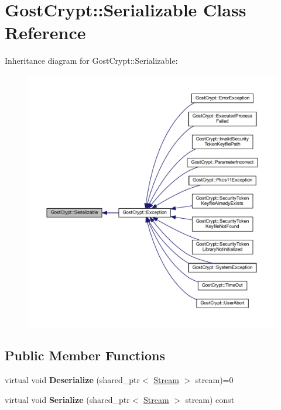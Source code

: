 \hypertarget{class_gost_crypt_1_1_serializable}{}\section{Gost\+Crypt\+:\+:Serializable Class Reference}
\label{class_gost_crypt_1_1_serializable}


Inheritance diagram for Gost\+Crypt\+:\+:Serializable\+:
\nopagebreak
\begin{figure}[H]
\begin{center}
\leavevmode
\includegraphics[width=350pt]{class_gost_crypt_1_1_serializable__inherit__graph}
\end{center}
\end{figure}
\subsection*{Public Member Functions}
\begin{DoxyCompactItemize}
\item 
\mbox{\label{class_gost_crypt_1_1_serializable_ab49828f6674fc0a0da833bc2a31267d6}} 
virtual void {\bfseries Deserialize} (shared\+\_\+ptr$<$ \hyperlink{class_gost_crypt_1_1_stream}{Stream} $>$ stream)=0
\item 
\mbox{\label{class_gost_crypt_1_1_serializable_a714dab70c126b478eb83d1637e49e4fc}} 
virtual void {\bfseries Serialize} (shared\+\_\+ptr$<$ \hyperlink{class_gost_crypt_1_1_stream}{Stream} $>$ stream) const
\end{DoxyCompactItemize}
